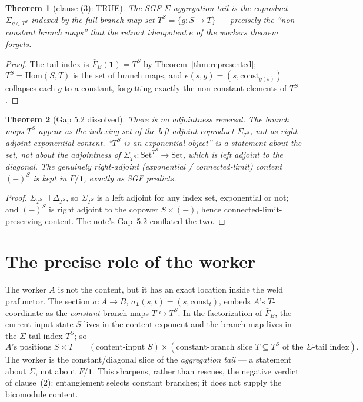 \documentclass[11pt]{article}
\newtheorem{theorem}{Theorem}
\theoremstyle{definition}
\newcommand{\Set}{\mathrm{Set}}
\newcommand{\Hom}{\mathrm{Hom}}
\begin{document}
\begin{theorem}[clause (3): TRUE]\label{thm:clause3}
The SGF $\Sigma$-aggregation tail is the coproduct $\Sigma_{g\in T^{S}}$ indexed by the
full branch-map set $T^{S}=\{g\colon S\to T\}$ --- precisely the ``non-constant branch
maps'' that the retract idempotent $e$ of the workers theorem forgets.
\end{theorem}

\begin{proof}
The tail index is $\bar F_{B}(\mathbf 1)=T^{S}$ by Theorem~\ref{thm:represented};
$T^{S}=\Hom(S,T)$ is the set of branch maps, and $e(s,g)=(s,\mathrm{const}_{g(s)})$
collapses each $g$ to a constant, forgetting exactly the non-constant elements of $T^{S}$.
\end{proof}

\begin{theorem}[Gap 5.2 dissolved]\label{thm:gap}
There is no adjointness reversal. The branch maps $T^{S}$ appear as the \emph{indexing
set} of the left-adjoint coproduct $\Sigma_{T^{S}}$, not as right-adjoint exponential
content. ``$T^{S}$ is an exponential object'' is a statement about the \emph{set}, not
about the adjointness of $\Sigma_{T^{S}}\colon\Set^{T^{S}}\to\Set$, which is left adjoint to
the diagonal. The genuinely right-adjoint (exponential / connected-limit) content
$(-)^{S}$ is \emph{kept} in $F/\mathbf 1$, exactly as SGF predicts.
\end{theorem}

\begin{proof}
$\Sigma_{T^{S}}\dashv\Delta_{T^{S}}$, so $\Sigma_{T^{S}}$ is a left adjoint for any index
set, exponential or not; and $(-)^{S}$ is right adjoint to the copower $S\times(-)$, hence
connected-limit-preserving content. The note's Gap~5.2 conflated the two.
\end{proof}

\section{The precise role of the worker}\label{sec:role}

The worker $A$ is not the content, but it has an exact location inside the weld
prafunctor. The section $\sigma\colon A\to B$, $\sigma_{\mathbf 1}(s,t)=(s,\mathrm{const}_{t})$,
embeds $A$'s $T$-coordinate as the \emph{constant} branch maps $T\hookrightarrow T^{S}$. In
the factorization of $\bar F_{B}$, the current input state $S$ lives in the content exponent
and the branch map lives in the $\Sigma$-tail index $T^{S}$; so
\[
A\text{'s positions } S\times T\;=\;(\text{content-input }S)\times(\text{constant-branch
slice } T\subseteq T^{S}\text{ of the }\Sigma\text{-tail index}).
\]
The worker is the constant/diagonal slice of the \emph{aggregation tail} --- a statement
about $\Sigma$, not about $F/\mathbf 1$. This sharpens, rather than rescues, the negative
verdict of clause~(2): entanglement selects constant branches; it does not supply the
bicomodule content.
\end{document}
